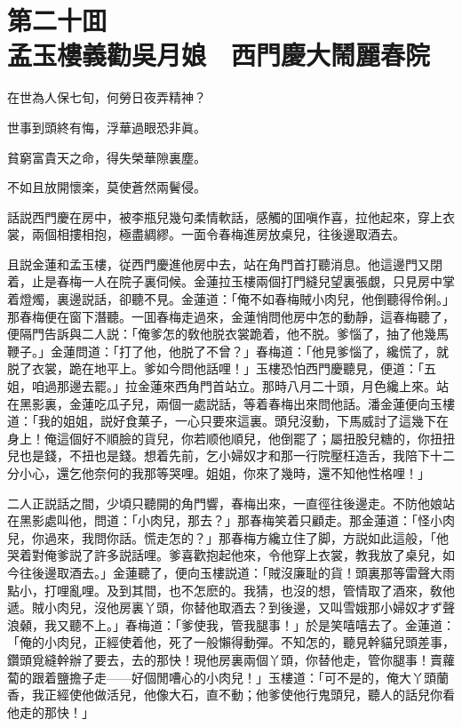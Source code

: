 
\chapter*{第二十囬　\\孟玉樓義勸吳月娘　西門慶大鬧麗春院}


\begin{myquote}
在世為人保七旬，何勞日夜弄精神？

世事到頭終有悔，浮華過眼恐非眞。

貧窮富貴天之命，得失榮華隙裏塵。

不如且放開懷楽，莫使蒼然兩鬢侵。
\end{myquote}

話説西門慶在房中，被李瓶兒幾句柔情軟話，感觸的囬嗔作喜，拉他起來，穿上衣裳，兩個相摟相抱，極盡綢繆。一面令春梅進房放桌兒，往後邊取酒去。

且説金蓮和孟玉樓，従西門慶進他房中去，站在角門首打聽消息。他這邊門又閉着，止是春梅一人在院子裏伺候。金蓮拉玉樓兩個打門縫兒望裏張覷，只見房中掌着燈燭，裏邊説話，卻聽不見。金蓮道：「俺不如春梅賊小肉兒，他倒聽得伶俐。」那春梅便在窗下潛聽。一囬春梅走過來，金蓮悄問他房中怎的動靜，這春梅聽了，便隔門告訴與二人説：「俺爹怎的敎他脱衣裳跪着，他不脱。爹惱了，抽了他幾馬鞭子。」金蓮問道：「打了他，他脱了不曾？」春梅道：「他見爹惱了，纔慌了，就脱了衣裳，跪在地平上。爹如今問他話哩！」玉樓恐怕西門慶聽見，便道：「五姐，咱過那邊去罷。」拉金蓮來西角門首站立。那時八月二十頭，月色纔上來。站在黑影裏，金蓮吃瓜子兒，兩個一處説話，等着春梅出來問他話。潘金蓮便向玉樓道：「我的姐姐，説好食菓子，一心只要來這裏。頭兒沒動，下馬威討了這幾下在身上！俺這個好不順臉的貨兒，你若顺他順兒，他倒罷了；屬扭股兒糖的，你扭扭兒也是錢，不扭也是錢。想着先前，乞小婦奴才和那一行院壓枉造舌，我陪下十二分小心，還乞他奈何的我那等哭哩。姐姐，你來了幾時，還不知他性格哩！」

二人正説話之間，少頃只聽開的角門響，春梅出來，一直徑往後邊走。不防他娘站在黑影處叫他，問道：「小肉兒，那去？」那春梅笑着只顧走。那金蓮道：「怪小肉兒，你過來，我問你話。慌走怎的？」那春梅方纔立住了脚，方説如此這般，「他哭着對俺爹説了許多説話哩。爹喜歡抱起他來，令他穿上衣裳，教我放了桌兒，如今往後邊取酒去。」金蓮聽了，便向玉樓説道：「賊沒廉耻的貨！頭裏那等雷聲大雨點小，打哩亂哩。及到其間，也不怎麽的。我猜，也沒的想，管情取了酒來，敎他遞。賊小肉兒，沒他房裏丫頭，你替他取酒去？到後邊，又叫雪娥那小婦奴才ず聲浪顙，我又聽不上。」春梅道：「爹使我，管我腿事！」於是笑嘻嘻去了。金蓮道：「俺的小肉兒，正經使着他，死了一般懶得動彈。不知怎的，聽見幹貓兒頭差事，鑽頭覓縫幹辦了要去，去的那快！現他房裏兩個丫頭，你替他走，管你腿事！賣蘿蔔的跟着鹽擔子走——好個閒嘈心的小肉兒！」玉樓道：「可不是的，俺大丫頭蘭香，我正經使他做活兒，他像大石，直不動；他爹使他行鬼頭兒，聽人的話兒你看他走的那快！」

